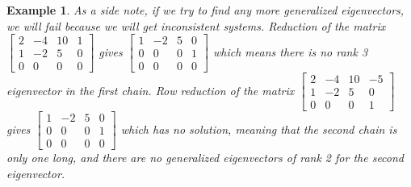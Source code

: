 \documentclass[10pt]{article}
\theoremstyle{plain}
\theoremstyle{box}
\newtheorem{example}{Example}
\begin{document}
\begin{example}
As a side note, if we try to find any more generalized eigenvectors, we will fail because we will get inconsistent systems. Reduction of the matrix 
$ \begin{bmatrix} 2&-4&10&1\\1&-2&5&0
\\0&0&0&0\end{bmatrix} 
$ gives $\begin{bmatrix} 1&-2&5&0\\0&0&0&1
\\0&0&0&0\end{bmatrix}$ which means there is no rank 3 eigenvector in the first chain. Row reduction of the matrix 
$ \begin{bmatrix} 2&-4&10&-5\\1&-2&5&0
\\0&0&0&1\end{bmatrix} 
$ gives $\begin{bmatrix} 1&-2&5&0\\0&0&0&1
\\0&0&0&0\end{bmatrix}$ which has no solution, meaning that the second chain is only one long, and there are no generalized eigenvectors of rank 2 for the second eigenvector.  
\end{example}
\end{document}
